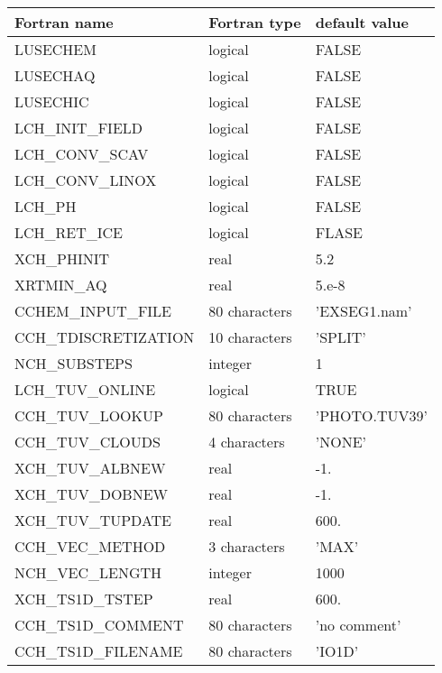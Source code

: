 \begin{center}
\begin{tabular} {|l|l|l|}
\hline
Fortran name & Fortran type & default value \\
\hline
LUSECHEM                & logical       & FALSE      \\
LUSECHAQ 		&logical 	&FALSE\\
LUSECHIC 		&logical 	&FALSE\\
LCH\_INIT\_FIELD 		&logical 	&FALSE\\
LCH\_CONV\_SCAV 		&logical 	&FALSE\\
LCH\_CONV\_LINOX 		&logical 	&FALSE\\
LCH\_PH			&logical	&FALSE\\
LCH\_RET\_ICE		&logical	&FLASE\\
XCH\_PHINIT		&real		&5.2\\
XRTMIN\_AQ		&real		&5.e-8\\
CCHEM\_INPUT\_FILE 	&80 characters 	&'EXSEG1.nam'\\
CCH\_TDISCRETIZATION 	&10 characters 	&'SPLIT'\\
NCH\_SUBSTEPS 		&integer 	&1\\
LCH\_TUV\_ONLINE 		&logical 	&TRUE\\
CCH\_TUV\_LOOKUP 		&80 characters 	&'PHOTO.TUV39'\\
CCH\_TUV\_CLOUDS 		&4 characters 	&'NONE'\\
XCH\_TUV\_ALBNEW 		&real 		&-1.\\
XCH\_TUV\_DOBNEW 		&real 		&-1.\\
XCH\_TUV\_TUPDATE 	&real 		&600.\\
CCH\_VEC\_METHOD 		&3 characters 	&'MAX'\\
NCH\_VEC\_LENGTH 		&integer 	&1000\\
XCH\_TS1D\_TSTEP 		&real 		&600.\\
CCH\_TS1D\_COMMENT 	&80 characters 	&'no comment'\\
CCH\_TS1D\_FILENAME 	&80 characters 	&'IO1D'\\
\hline
\end{tabular}
\end{center}

